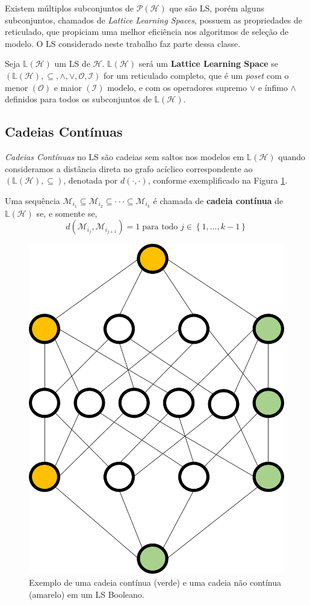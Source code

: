 Existem múltiplos subconjuntos de $\mathcal{P} \left( \mathcal{H} \right)$ que são LS, porém alguns subconjuntos, chamados de \textit{Lattice Learning Spaces}, possuem as propriedades de reticulado, que propiciam uma melhor eficiência nos algoritmos de seleção de modelo. O LS considerado neste trabalho faz parte dessa classe.

\begin{definition}
    Seja $\mathbb{L} \left( \mathcal{H} \right)$ um LS de $\mathcal{H}$. $\mathbb{L} \left( \mathcal{H} \right)$ será um \textbf{Lattice Learning Space} se $\left( \mathbb{L} \left( \mathcal{H} \right), \subseteq,\wedge,\vee, \mathcal{O}, \mathcal{I} \right)$ for um reticulado completo, que é um \textit{poset} com o menor $\left( \mathcal{O} \right)$ e maior $\left( \mathcal{I} \right)$ modelo, e com os operadores supremo $\vee$ e ínfimo $\wedge$ definidos para todos os subconjuntos de $\mathbb{L} \left( \mathcal{H} \right)$.
\end{definition}

\subsection{Cadeias Contínuas}

\textit{Cadeias Contínuas} no LS são cadeias sem saltos nos modelos em $\mathbb{L} \left( \mathcal{H} \right)$ quando consideramos a distância direta no grafo acíclico correspondente ao $\left( \mathbb{L} \left( \mathcal{H} \right),\subseteq \right)$, denotada por $d \left( \cdot , \cdot \right)$, conforme exemplificado na Figura \ref{fig:cadeia}.

\begin{definition}
    Uma sequência $\mathcal{M}_{i_{1}} \subseteq \mathcal{M}_{i_{2}} \subseteq \cdot \cdot \cdot \subseteq \mathcal{M}_{i_{k}} $ é chamada de \textbf{cadeia contínua} de $\mathbb{L} \left( \mathcal{H} \right)$ se, e somente se,
    $$d \left( \mathcal{M}_{i_{j}},\mathcal{M}_{i_{j+1}} \right) = 1 \; \text{para todo } j \in \left\{ 1,...,k-1 \right\}$$ 
\end{definition}

\begin{figure}
  \centering
  \includegraphics[width=.4\textwidth]{figuras/cadeia.png}
  \caption{Exemplo de uma cadeia contínua (verde) e uma cadeia não contínua (amarelo) em um LS Booleano.\label{fig:cadeia}}
\end{figure}

